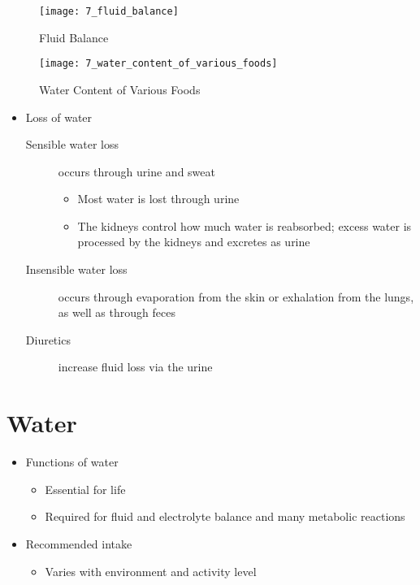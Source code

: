 \documentclass[title={Chapter 7}]{fdsn201notes}
\begin{document}
\begin{figure}[H]
	\centering
	\texttt{[image: 7\_fluid\_balance]}
	\caption{Fluid Balance}
	\label{fig:fluid_balance}
\end{figure}

\begin{figure}[H]
	\centering
	\texttt{[image: 7\_water\_content\_of\_various\_foods]}
	\caption{Water Content of Various Foods}
	\label{fig:water_content_of_various_foods}
\end{figure}

\begin{itemize}
	\item Loss of water
	\begin{description}
		\item[Sensible water loss] occurs through urine and sweat
		\begin{itemize}
			\item Most water is lost through urine
			\item The kidneys control how much water is reabsorbed; excess water is processed by the kidneys and excretes as urine
		\end{itemize}
		\item[Insensible water loss] occurs through evaporation from the skin or exhalation from the lungs, as well as through feces
		\item[Diuretics] increase fluid loss via the urine
	\end{description}
\end{itemize}

\section{Water}\label{sec:water}
\begin{itemize}
	\item Functions of water
	\begin{itemize}
		\item Essential for life
		\item Required for fluid and electrolyte balance and many metabolic reactions
	\end{itemize}
	\item Recommended intake
	\begin{itemize}
		\item Varies with environment and activity level
	\end{itemize}
\end{itemize}
\end{document}
